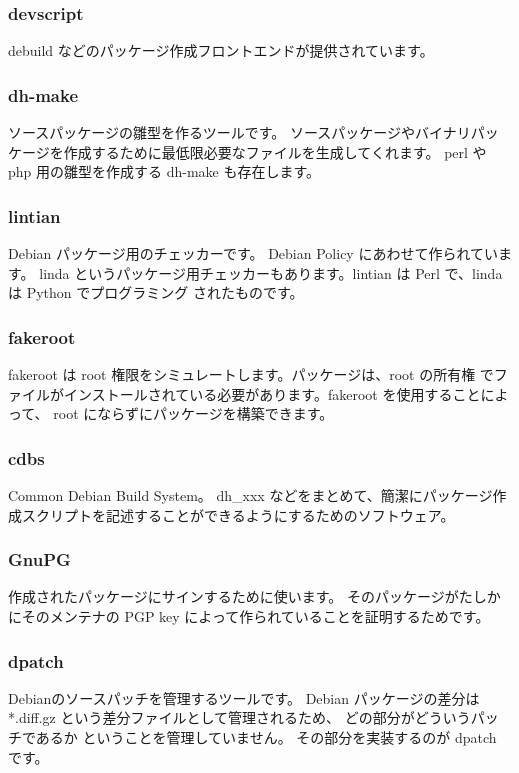 \documentclass[mingoth,a4paper]{jsarticle}
\begin{document}
\subsubsection{devscript}

	debuild などのパッケージ作成フロントエンドが提供されています。
	
\subsubsection{dh-make}
	ソースパッケージの雛型を作るツールです。
	ソースパッケージやバイナリパッケージを作成するために最低限必要なファイルを生成してくれます。
	perl や php 用の雛型を作成する dh-make も存在します。

	
\subsubsection{lintian}	
	Debian パッケージ用のチェッカーです。
	Debian Policy にあわせて作られています。
	linda というパッケージ用チェッカーもあります。lintian は Perl で、linda は Python でプログラミング
	されたものです。

\subsubsection{fakeroot}
	fakeroot は root 権限をシミュレートします。パッケージは、root の所有権
	でファイルがインストールされている必要があります。fakeroot を使用することによって、
	root にならずにパッケージを構築できます。  

\subsubsection{cdbs}
	Common Debian Build System。
	dh\_xxx などをまとめて、簡潔にパッケージ作成スクリプトを記述することができるようにするためのソフトウェア。
	
\subsubsection{GnuPG}
	作成されたパッケージにサインするために使います。
	そのパッケージがたしかにそのメンテナの PGP key によって作られていることを証明するためです。
	
\subsubsection{dpatch}

	Debianのソースパッチを管理するツールです。
	Debian パッケージの差分は *.diff.gz という差分ファイルとして管理されるため、 どの部分がどういうパッチであるか
	ということを管理していません。 その部分を実装するのが dpatch です。
\end{document}
